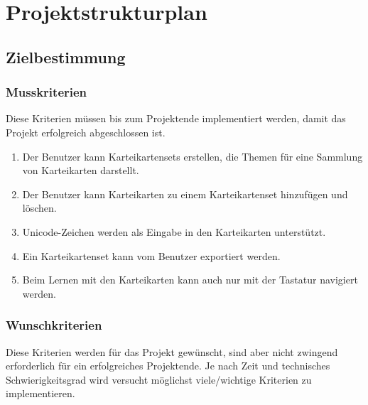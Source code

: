 \section{Projektstrukturplan}

\subsection{Zielbestimmung}
\subsubsection{Musskriterien}
Diese Kriterien müssen bis zum Projektende implementiert werden, damit das Projekt erfolgreich abgeschlossen ist.

\begin{enumerate}[leftmargin=2cm, label=\bfseries /MK\arabic*0/]
	\item Der Benutzer kann Karteikartensets erstellen, die Themen für eine Sammlung von Karteikarten darstellt.
	\item Der Benutzer kann Karteikarten zu einem Karteikartenset hinzufügen und löschen.
	\item\label{unicode} Unicode-Zeichen werden als Eingabe in den Karteikarten unterstützt.
	\item\label{export} Ein Karteikartenset kann vom Benutzer exportiert werden.
	
	\item\label{keyboard} Beim Lernen mit den Karteikarten kann auch nur mit der Tastatur navigiert werden.
\end{enumerate}


\subsubsection{Wunschkriterien}
Diese Kriterien werden für das Projekt gewünscht, sind aber nicht zwingend erforderlich für ein erfolgreiches Projektende. Je nach Zeit und technisches Schwierigkeitsgrad wird versucht möglichst viele/wichtige Kriterien zu implementieren.

